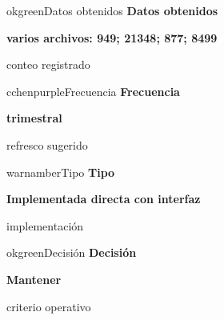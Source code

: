 \documentclass[9pt,a4paper]{extarticle}
\begin{document}
\vspace{0.04cm}
\begin{minipage}{0.24\textwidth}
\begin{metricbox}{okgreen}{Datos obtenidos}
{\large\bfseries Datos obtenidos}\par
{\Large\bfseries varios archivos: 949; 21348; 877; 8499}\par
{\normalsize conteo registrado}
\end{metricbox}
\end{minipage}\hfill
\begin{minipage}{0.24\textwidth}
\begin{metricbox}{cchenpurple}{Frecuencia}
{\large\bfseries Frecuencia}\par
{\large\bfseries trimestral}\par
{\normalsize refresco sugerido}
\end{metricbox}
\end{minipage}\hfill
\begin{minipage}{0.24\textwidth}
\begin{metricbox}{warnamber}{Tipo}
{\large\bfseries Tipo}\par
{\normalsize\bfseries Implementada directa con interfaz}\par
{\normalsize implementación}
\end{metricbox}
\end{minipage}\hfill
\begin{minipage}{0.24\textwidth}
\begin{metricbox}{okgreen}{Decisión}
{\large\bfseries Decisión}\par
{\normalsize\bfseries Mantener}\par
{\normalsize criterio operativo}
\end{metricbox}
\end{minipage}
\end{document}
